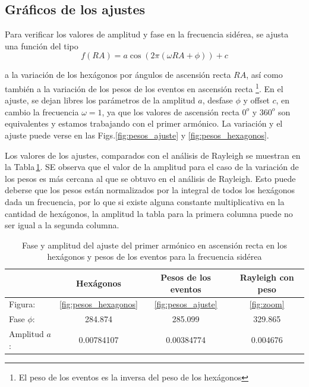 	\subsection{Gráficos de los ajustes}

Para verificar los valores de amplitud y fase en la frecuencia sidérea, se ajusta una función del tipo 
\begin{equation}
	f(RA) = a\cos{(2\pi(\omega RA + \phi))} +c
\end{equation}

a la variación de los hexágonos por ángulos de ascensión recta $RA$, así como también a la variación de los pesos de los eventos en ascensión recta \footnote{El peso de los eventos es la inversa del peso de los hexágonos}. En el ajuste, se dejan libres los parámetros de la amplitud $a$, desfase $\phi$ y offset $c$, en cambio la frecuencia $\omega=1$, ya que los valores de ascensión recta $0^o$ y $360^o$ son equivalentes y estamos trabajando con el primer armónico. La variación y el ajuste puede verse en las Figs.\ref{fig:pesos_ajuste} y \ref{fig:pesos_hexagonos}.

Los valores de los ajustes, comparados con el análisis de Rayleigh se muestran en la Tabla\,\ref{tabla:ajuste_primer_armonico}. SE observa que el valor de la amplitud para el caso de la variación de los pesos es más cercana al que se obtuvo en el análisis de Rayleigh. Esto puede deberse que los pesos están normalizados por la integral de todos los hexágonos dada un frecuencia, por lo que si existe alguna constante multiplicativa en la cantidad de hexágonos, la amplitud la tabla para la primera columna puede no ser igual a la segunda columna.

\begin{table}[H]
\centering
\begin{tabular}{l|c|c|||c}
				& Hexágonos 				& Pesos	de los eventos		& Rayleigh con peso \\ \hline
Figura:			& \ref{fig:pesos_hexagonos} &\ref{fig:pesos_ajuste}		&\ref{fig:zoom} \\
Fase $\phi$:	& 284.874 	 				& 285.099					&329.865	\\
Amplitud $a$:	& 0.00784107 				&  0.00384774 				&0.004676\\
\end{tabular}
\caption{Fase y amplitud del ajuste del primer armónico en ascensión recta en los hexágonos y  pesos  de los eventos para la frecuencia sidérea}
\label{tabla:ajuste_primer_armonico}
\end{table}



